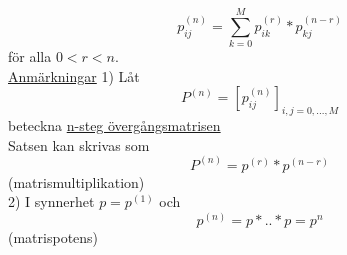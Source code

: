 \documentclass[8pt]{extarticle}
\begin{document}
\begin{multicols*}{2}
\begin{equation*}
p_{ij}^{(n)} = \sum_{k=0}^M p_{ik}^{(r)} * p_{kj}^{(n-r)}
\end{equation*}
för alla $0<r<n$.\\
\underline{Anmärkningar} 1) Låt
\begin{equation*}
P^{(n)} = [p_{ij}^{(n)}]_{i,j = 0,...,M}
\end{equation*}
beteckna \underline{n-steg övergångsmatrisen}\\
Satsen kan skrivas som $$P^{(n)} = p^{(r)} * p^{(n-r)}$$ (matrismultiplikation)\\
2) I synnerhet $p=p^{(1)}$ och $$p^{(n)} = p*..*p=p^n$$ (matrispotens)

\end{multicols*}
\end{document}
